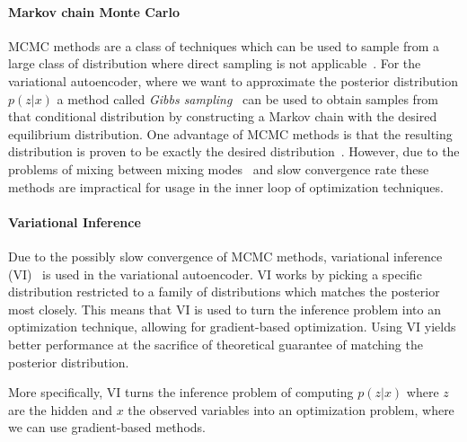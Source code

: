 \paragraph{Markov chain Monte Carlo}
MCMC methods are a class of techniques which can be used to sample from a large class of distribution where direct sampling is not applicable~\cite[Chapter~11.2]{bishop:2006}.
For the variational autoencoder, where we want to approximate the posterior distribution $p(z|x)$ a method called \emph{Gibbs sampling}~\cite[Chapter~11.3]{bishop:2006} can be used to obtain samples from that conditional distribution by constructing a Markov chain with the desired equilibrium distribution.
%
One advantage of MCMC methods is that the resulting distribution is proven to be exactly the desired distribution~\cite[Chapter~11.3]{bishop:2006}.
However, due to the problems of mixing between mixing modes~\cite[Chapter~17.5]{deeplearning:2016} and slow convergence rate\cite[p.~603]{deeplearning:2016} these methods are impractical for usage in the inner loop of optimization techniques.

\paragraph{Variational Inference}
Due to the possibly slow convergence of MCMC methods, variational inference (VI)~\cite[Chapter~19.4]{deeplearning:2016} is used in the variational autoencoder.
VI works by picking a specific distribution restricted to a family of distributions which matches the posterior most closely. This means that VI is used to turn the inference problem into an optimization technique, allowing for gradient-based optimization.
Using VI yields better performance at the sacrifice of theoretical guarantee of matching the posterior distribution.


More specifically, VI turns the inference problem of computing $p(z|x)$ where $z$ are the hidden and $x$ the observed variables into an optimization problem, where we can use gradient-based methods.


